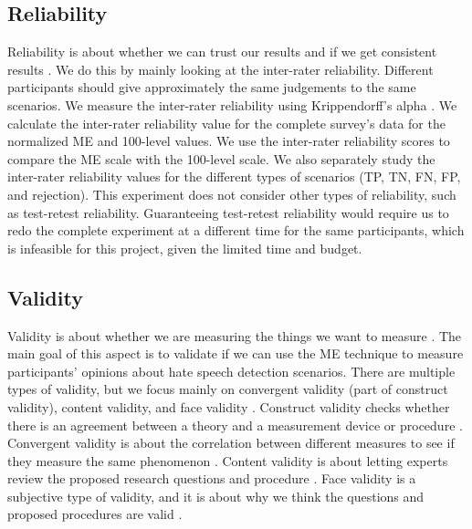 \subsection{Reliability}
\label{sec:reliability}
Reliability is about whether we can trust our results and if we get consistent results \citep{fitzner2007reliability}.
%
We do this by mainly looking at the inter-rater reliability.
%
Different participants should give approximately the same judgements to the same scenarios.
%
We measure the inter-rater reliability using Krippendorff's alpha \citep{maddalena2017crowdsourcing, krippendorff2004reliability}.
%
We calculate the inter-rater reliability value for the complete survey's data for the normalized ME and 100-level values.
%
We use the inter-rater reliability scores to compare the ME scale with the 100-level scale.
%
We also separately study the inter-rater reliability values for the different types of scenarios (TP, TN, FN, FP, and rejection).
%
This experiment does not consider other types of reliability, such as test-retest reliability.
%
Guaranteeing test-retest reliability would require us to redo the complete experiment at a different time for the same participants, which is infeasible for this project, given the limited time and budget.

\subsection{Validity}
\label{sec:analysis-validity}
Validity is about whether we are measuring the things we want to measure \citep{fitzner2007reliability}.
%
The main goal of this aspect is to validate if we can use the ME technique to measure participants' opinions about hate speech detection scenarios.
%
There are multiple types of validity, but we focus mainly on convergent validity (part of construct validity), content validity, and face validity \citep{fitzner2007reliability}.
%
Construct validity checks whether there is an agreement between a theory and a measurement device or procedure \citep{fitzner2007reliability}.
%
Convergent validity is about the correlation between different measures to see if they measure the same phenomenon \citep{fitzner2007reliability}.
%
Content validity is about letting experts review the proposed research questions and procedure \citep{fitzner2007reliability}.
%
Face validity is a subjective type of validity, and it is about why we think the questions and proposed procedures are valid \citep{fitzner2007reliability}.
%

